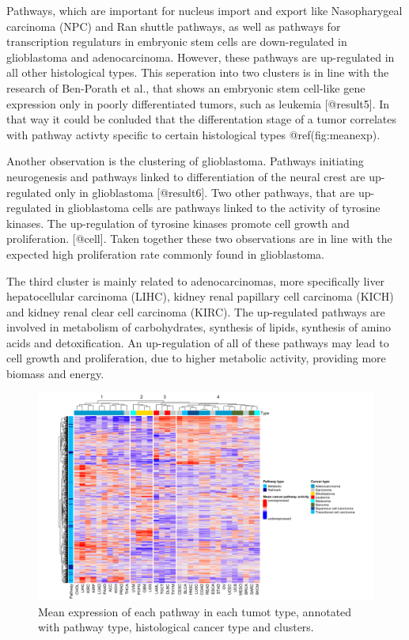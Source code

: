 \documentclass[
]{article}
\begin{document}
Pathways, which are important for nucleus import and export like
Nasopharygeal carcinoma (NPC) and Ran shuttle pathways, as well as
pathways for transcription regulaturs in embryonic stem cells are
down-regulated in glioblastoma and adenocarcinoma. However, these
pathways are up-regulated in all other histological types. This
seperation into two clusters is in line with the research of Ben-Porath
et al., that shows an embryonic stem cell-like gene expression only in
poorly differentiated tumors, such as leukemia {[}@result5{]}. In that
way it could be conluded that the differentation stage of a tumor
correlates with pathway activty specific to certain histological types
@ref(fig:meanexp).

Another observation is the clustering of glioblastoma. Pathways
initiating neurogenesis and pathways linked to differentiation of the
neural crest are up-regulated only in glioblastoma {[}@result6{]}. Two
other pathways, that are up-regulated in glioblastoma cells are pathways
linked to the activity of tyrosine kinases. The up-regulation of
tyrosine kinases promote cell growth and proliferation. {[}@cell{]}.
Taken together these two observations are in line with the expected high
proliferation rate commonly found in glioblastoma.

The third cluster is mainly related to adenocarcinomas, more
specifically liver hepatocellular carcinoma (LIHC), kidney renal
papillary cell carcinoma (KICH) and kidney renal clear cell carcinoma
(KIRC). The up-regulated pathways are involved in metabolism of
carbohydrates, synthesis of lipids, synthesis of amino acids and
detoxification. An up-regulation of all of these pathways may lead to
cell growth and proliferation, due to higher metabolic activity,
providing more biomass and energy.

\begin{figure}

{\centering \includegraphics[width=0.5\linewidth]{figures/Pan Cancer mean expression} 

}

\caption{Mean expression of each pathway in each tumot type, annotated with pathway type, histological cancer type and clusters.}\label{fig:meanexp}
\end{figure}
\end{document}
